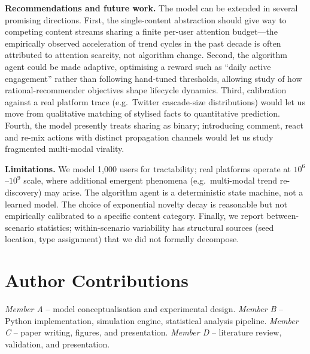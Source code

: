 \documentclass[sigconf, nonacm]{acmart}
\begin{document}
\medskip
\noindent
\textbf{Recommendations and future work.}
The model can be extended in several promising directions.  First, the
single-content abstraction should give way to competing content streams
sharing a finite per-user attention budget---the empirically observed
acceleration of trend cycles in the past decade is often attributed to
attention scarcity, not algorithm change.  Second, the algorithm agent
could be made adaptive, optimising a reward such as ``daily active
engagement'' rather than following hand-tuned thresholds, allowing study
of how rational-recommender objectives shape lifecycle dynamics.
Third, calibration against a real platform trace (e.g.\ Twitter
cascade-size distributions) would let us move from qualitative
matching of stylised facts to quantitative prediction.  Fourth, the
model presently treats sharing as binary; introducing comment, react
and re-mix actions with distinct propagation channels would let us
study fragmented multi-modal virality.

\medskip
\noindent
\textbf{Limitations.}
We model 1{,}000 users for tractability; real platforms operate at
$10^6$--$10^9$ scale, where additional emergent phenomena
(e.g.\ multi-modal trend re-discovery) may arise.  The algorithm agent
is a deterministic state machine, not a learned model.  The choice of
exponential novelty decay is reasonable but not empirically calibrated
to a specific content category.  Finally, we report between-scenario
statistics; within-scenario variability has structural sources
(seed location, type assignment) that we did not formally decompose.

\section*{Author Contributions}

\noindent\emph{Member A} -- model conceptualisation and experimental
design.\quad
\emph{Member B} -- Python implementation, simulation engine, statistical
analysis pipeline.\quad
\emph{Member C} -- paper writing, figures, and presentation.\quad
\emph{Member D} -- literature review, validation, and presentation.
\end{document}
